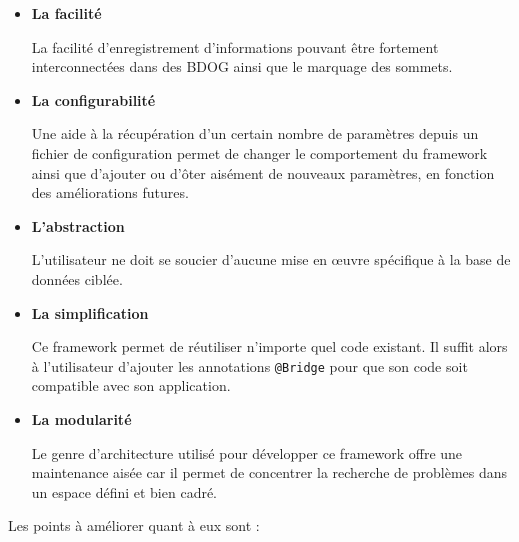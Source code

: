 \documentclass[a4paper,fleqn,12pt,oneside]{book}
\begin{document}
\begin{itemize}
\item \textbf{La facilité}

\quad La facilité d'enregistrement d'informations pouvant être fortement interconnectées dans des BDOG ainsi que le marquage des sommets.

\item \textbf{La configurabilité}

\quad Une aide à la récupération d'un certain nombre de paramètres depuis un fichier de configuration permet de changer le comportement du framework ainsi que d'ajouter ou d'ôter aisément de nouveaux paramètres, en fonction des améliorations futures.

\item \textbf{L'abstraction}

\quad L'utilisateur ne doit se soucier d'aucune mise en œuvre spécifique à la base de données ciblée. 

\item \textbf{La simplification}

\quad Ce framework permet de réutiliser n'importe quel code existant. Il suffit alors à l'utilisateur d'ajouter les annotations \texttt{@Bridge} pour que son code soit compatible avec son application.

\item \textbf{La modularité}

\quad Le genre d'architecture utilisé pour développer ce framework offre une maintenance aisée car il permet de concentrer la recherche de problèmes dans un espace défini et bien cadré.

\end{itemize}
\newpage
Les points à améliorer quant à eux sont :
\end{document}
